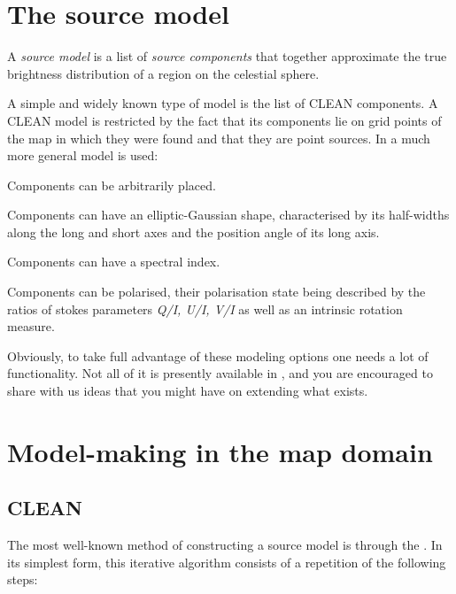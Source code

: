 \section{ The \NEWSTAR source model }

	A {\em source model} is a list of {\em source components} that together
approximate the true brightness distribution of a region on the celestial
sphere.

	A simple and widely known type of model is the list of CLEAN
components. A CLEAN model is restricted by the fact that its components lie on
grid points of the map in which they were found and that they are point sources.
In \NEWSTAR a much more general model is used:

\bi
\item   Components can be arbitrarily placed.

\item   Components can have an elliptic-Gaussian shape, characterised by its
half-widths along the long and short axes and the position angle of its long
axis.

\item   Components can have a spectral index.

\item   Components can be polarised, their polarisation state being described
by the ratios of stokes parameters {\em Q/I, U/I, V/I} as well as an intrinsic
rotation measure.
\ei

	Obviously, to take full advantage of these modeling options one needs a
lot of functionality. Not all of it is presently available in \NEWSTAR, and you
are encouraged to share with us ideas that you might have on extending what
exists.




\section{ Model-making in the map domain }
\label{.methods}


\subsection{ CLEAN }
\label{.clean}

	The most well-known method of constructing a source model is through
the . In its simplest form, this
iterative algorithm consists of a repetition of the following steps:

